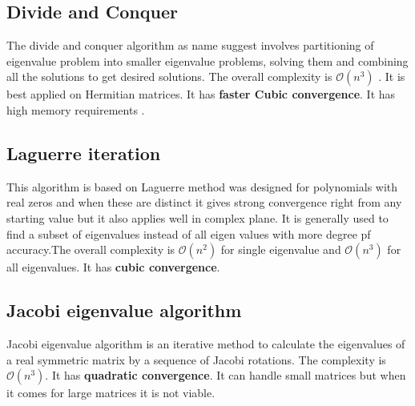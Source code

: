 \documentclass[pdflatex,sn-mathphys-num]{sn-jnl}
\begin{document}
\subsection{Divide and Conquer}
 The divide and conquer algorithm as name suggest involves partitioning of eigenvalue problem into smaller eigenvalue problems, solving them and combining all the solutions to get desired solutions. The overall complexity is $\mathcal{O}(n^3)$ . It is best applied on Hermitian matrices. It has \textbf{ faster Cubic convergence}. It has high memory requirements .
 
\subsection{Laguerre iteration}
This algorithm is based on Laguerre method was designed for polynomials with real zeros and when these are distinct it gives strong convergence right from any starting value but it also applies well in complex plane. It is generally used to find a subset of eigenvalues instead of all eigen values with more degree pf accuracy.The overall complexity is $\mathcal{O}(n^2)$ for single eigenvalue and  $\mathcal{O}(n^3)$ for all eigenvalues. It has \textbf{cubic convergence}.


\subsection{Jacobi eigenvalue algorithm}
Jacobi eigenvalue algorithm is an iterative method to calculate the eigenvalues  of a real symmetric matrix by a sequence of Jacobi rotations. The  complexity is $\mathcal{O}(n^3)$. It has \textbf{quadratic convergence}. It can handle small matrices but when it comes for large matrices it is not viable. 
\end{document}
